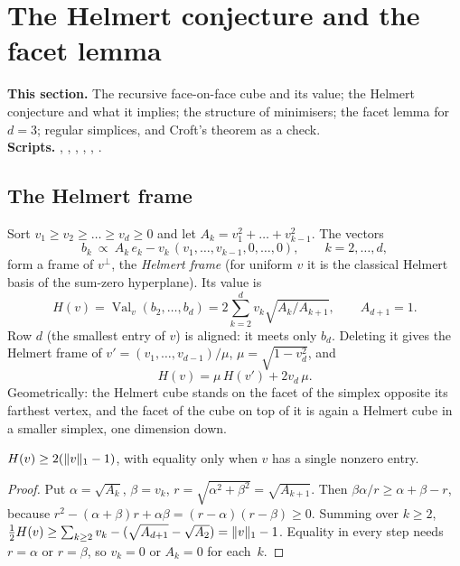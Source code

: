 \documentclass[11pt,a4paper]{article}
\newcommand{\status}[1]{\textsf{\small[#1]}}
\newcommand{\Val}{\operatorname{Val}}
\begin{document}
\section{The Helmert conjecture and the facet lemma}\label{sec:helmert}

\begin{summarybox}
\textbf{This section.} The recursive face-on-face cube and its value; the Helmert conjecture and what it implies; the structure of minimisers; the facet lemma for $d=3$; regular simplices, and Croft's theorem as a check.\\
\textbf{Scripts.} , , , , , .
\end{summarybox}

\subsection{The Helmert frame}
Sort $v_1\ge v_2\ge\dots\ge v_d\ge0$ and let $A_k=v_1^2+\dots+v_{k-1}^2$. The vectors
\[
b_k\ \propto\ A_k\,e_k-v_k\,(v_1,\dots,v_{k-1},0,\dots,0),\qquad k=2,\dots,d,
\]
form a frame of $v^\perp$, the \emph{Helmert frame} (for uniform $v$ it is the classical Helmert basis of the sum-zero hyperplane). Its value is
\[
H(v)=\Val_v(b_2,\dots,b_d)=2\sum_{k=2}^dv_k\sqrt{A_k/A_{k+1}},\qquad A_{d+1}=1.
\]
Row $d$ (the smallest entry of $v$) is aligned: it meets only $b_d$. Deleting it gives the Helmert frame of $v'=(v_1,\dots,v_{d-1})/\mu$, $\mu=\sqrt{1-v_d^2}$, and
\begin{equation}\label{eq:Hrec}
H(v)=\mu\,H(v')+2v_d\,\mu .
\end{equation}
Geometrically: the Helmert cube stands on the facet of the simplex opposite its farthest vertex, and the facet of the cube on top of it is again a Helmert cube in a smaller simplex, one dimension down.

\begin{proposition}[\status{proof}]\label{prop:Htele}
$H(v)\ge2(\lVert v\rVert_1-1)$, with equality only when $v$ has a single nonzero entry.
\end{proposition}
\begin{proof}
Put $\alpha=\sqrt{A_k}$, $\beta=v_k$, $r=\sqrt{\alpha^2+\beta^2}=\sqrt{A_{k+1}}$. Then $\beta\alpha/r\ge\alpha+\beta-r$, because $r^2-(\alpha+\beta)r+\alpha\beta=(r-\alpha)(r-\beta)\ge0$. Summing over $k\ge2$, $\frac12H(v)\ge\sum_{k\ge2}v_k-(\sqrt{A_{d+1}}-\sqrt{A_2})=\lVert v\rVert_1-1$. Equality in every step needs $r=\alpha$ or $r=\beta$, so $v_k=0$ or $A_k=0$ for each~$k$.
\end{proof}
\end{document}
